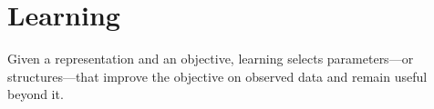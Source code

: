 \part{Learning}
\label{part:learning}

Given a representation and an objective, learning selects parameters---or structures---that improve the objective on observed data and remain useful beyond it.
